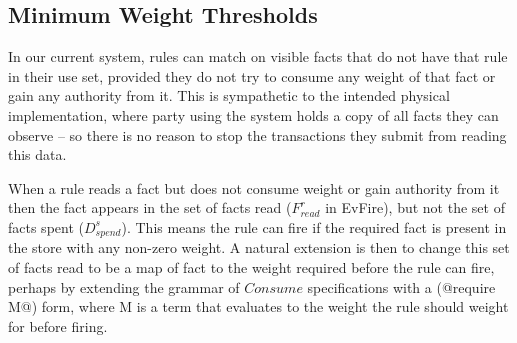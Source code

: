 \subsection{Minimum Weight Thresholds}
In our current system, rules can match on visible facts that do not have that rule in their use set, provided they do not try to consume any weight of that fact or gain any authority from it. This is sympathetic to the intended physical implementation, where party using the system holds a copy of all facts they can observe -- so there is no reason to stop the transactions they submit from reading this data.

When a rule reads a fact but does not consume weight or gain authority from it then the fact appears in the set of facts read ($F^r_{read}$ in EvFire), but not the set of facts spent ($D^s_{spend}$). This means the rule can fire if the required fact is present in the store with any non-zero weight. A natural extension is then to change this set of facts read to be a map of fact to the weight required before the rule can fire, perhaps by extending the grammar of $Consume$ specifications with a (@require M@) form, where M is a term that evaluates to the weight the rule should weight for before firing.




